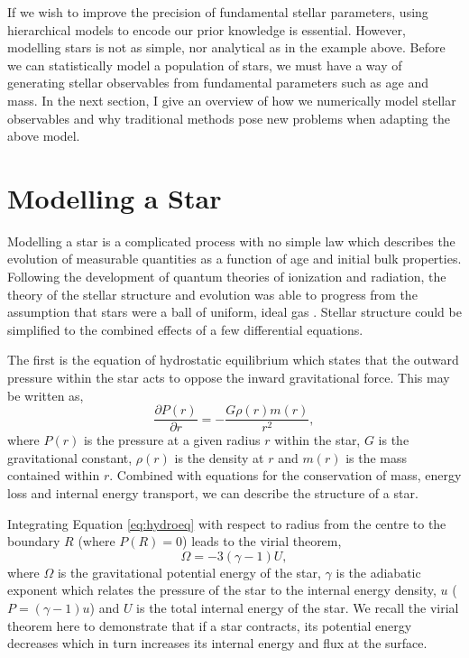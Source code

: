 If we wish to improve the precision of fundamental stellar parameters, using hierarchical models to encode our prior knowledge is essential. However, modelling stars is not as simple, nor analytical as in the example above. Before we can statistically model a population of stars, we must have a way of generating stellar observables from fundamental parameters such as age and mass. In the next section, I give an overview of how we numerically model stellar observables and why traditional methods pose new problems when adapting the above model.

\section{Modelling a Star}\label{sec:models}

Modelling a star is a complicated process with no simple law which describes the evolution of measurable quantities as a function of age and initial bulk properties. Following the development of quantum theories of ionization and radiation, the theory of the stellar structure and evolution was able to progress from the assumption that stars were a ball of uniform, ideal gas \citet{Eddington1926}. Stellar structure could be simplified to the combined effects of a few differential equations.

The first is the equation of hydrostatic equilibrium which states that the outward pressure within the star acts to oppose the inward gravitational force. This may be written as,
\begin{equation}
    \frac{\partial P(r)}{\partial r}=-\frac{G \rho(r) m(r)}{r^{2}},\label{eq:hydroeq}
\end{equation}
where $P(r)$ is the pressure at a given radius $r$ within the star, $G$ is the gravitational constant, $\rho(r)$ is the density at $r$ and $m(r)$ is the mass contained within $r$. Combined with equations for the conservation of mass, energy loss and internal energy transport, we can describe the structure of a star.

Integrating Equation \ref{eq:hydroeq} with respect to radius from the centre to the boundary $R$ (where $P(R)=0$) leads to the virial theorem,
\begin{equation}
    \Omega = - 3(\gamma - 1) U,
\end{equation}
where $\Omega$ is the gravitational potential energy of the star, $\gamma$ is the adiabatic exponent which relates the pressure of the star to the internal energy density, $u$ ($P = (\gamma - 1) u$) and $U$ is the total internal energy of the star. We recall the virial theorem here to demonstrate that if a star contracts, its potential energy decreases which in turn increases its internal energy and flux at the surface.

